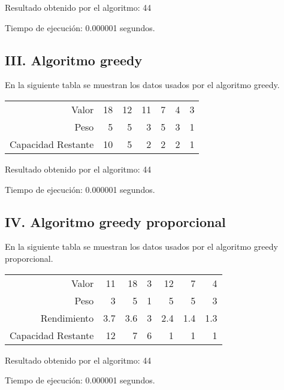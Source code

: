 \documentclass{article}
\begin{document}
Resultado obtenido por el algoritmo: 44

Tiempo de ejecución: 0.000001 segundos.
\subsection*{III. Algoritmo greedy}
En la siguiente tabla se muestran los datos usados por el algoritmo greedy.
\begin{table}[h]
\centering
\begin{tabular}{r|rrrrrr}
Valor&18&12&11&7&4&3\\
Peso&5&5&3&5&3&1\\
\hline Capacidad Restante&10&5&2&2&2&1\\
\end{tabular}
\end{table}

Resultado obtenido por el algoritmo: 44

Tiempo de ejecución: 0.000001 segundos.
\subsection*{IV. Algoritmo greedy proporcional}
En la siguiente tabla se muestran los datos usados por el algoritmo greedy proporcional.
\begin{table}[h]
\centering
\begin{tabular}{r|rrrrrr}
Valor&11&18&3&12&7&4\\
Peso&3&5&1&5&5&3\\
Rendimiento&3.7&3.6&3&2.4&1.4&1.3\\
\hline Capacidad Restante&12&7&6&1&1&1\\
\end{tabular}
\end{table}

Resultado obtenido por el algoritmo: 44

Tiempo de ejecución: 0.000001 segundos.
\end{document}
